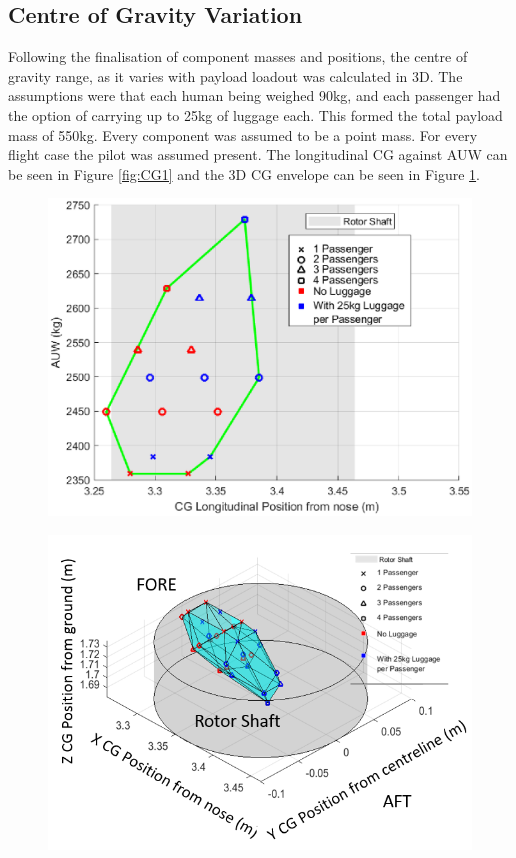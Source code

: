 \documentclass[11pt,a4paper]{article}
\begin{document}
\subsection{Centre of Gravity Variation}
Following the finalisation of component masses and positions, the centre of gravity range, as it varies with payload loadout was calculated in 3D. The assumptions were that each human being weighed 90kg, and each passenger had the option of carrying up to 25kg of luggage each. This formed the total payload mass of 550kg. Every component was assumed to be a point mass. For every flight case the pilot was assumed present.
The longitudinal CG against AUW can be seen in Figure \ref{fig:CG1} and the 3D CG envelope can be seen in Figure \ref{fig:CG2}.

\begin{figure}[H]
\centering
\begin{minipage}{.5\textwidth}
  \centering
  \includegraphics[width=\linewidth]{CGVAUW.eps}
  \label{fig:CG1}
\end{minipage}%
\begin{minipage}{.5\textwidth}
  \centering
  \includegraphics[width=\linewidth]{3D.PNG}
  \label{fig:CG2}
\end{minipage}
\end{figure}
\end{document}
